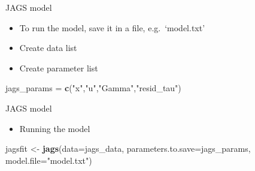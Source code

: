 \documentclass[
  ignorenonframetext,
]{beamer}
\newenvironment{Shaded}{\begin{snugshade}}{\end{snugshade}}
\newcommand{\DataTypeTok}[1]{\textcolor[rgb]{0.13,0.29,0.53}{#1}}
\newcommand{\KeywordTok}[1]{\textcolor[rgb]{0.13,0.29,0.53}{\textbf{#1}}}
\newcommand{\NormalTok}[1]{#1}
\newcommand{\OperatorTok}[1]{\textcolor[rgb]{0.81,0.36,0.00}{\textbf{#1}}}
\newcommand{\StringTok}[1]{\textcolor[rgb]{0.31,0.60,0.02}{#1}}
\providecommand{\tightlist}{%
  \setlength{\itemsep}{0pt}\setlength{\parskip}{0pt}}
\begin{document}
\begin{frame}[fragile]{JAGS model}
\protect\hypertarget{jags-model-5}{}

\begin{itemize}
\item
  To run the model, save it in a file, e.g.~`model.txt'
\item
  Create data list
\end{itemize}

\begin{Shaded}
\end{Shaded}

\begin{itemize}
\tightlist
\item
  Create parameter list
\end{itemize}

\begin{Shaded}
\begin{Highlighting}[]
\NormalTok{jags_params =}\StringTok{ }\KeywordTok{c}\NormalTok{(}\StringTok{"x"}\NormalTok{,}\StringTok{"u"}\NormalTok{,}\StringTok{"Gamma"}\NormalTok{,}\StringTok{"resid_tau"}\NormalTok{)}
\end{Highlighting}
\end{Shaded}

\end{frame}

\begin{frame}[fragile]{JAGS model}
\protect\hypertarget{jags-model-6}{}

\begin{itemize}
\tightlist
\item
  Running the model
\end{itemize}

\begin{Shaded}
\begin{Highlighting}[]
\NormalTok{jagsfit <-}\StringTok{ }\KeywordTok{jags}\NormalTok{(}\DataTypeTok{data=}\NormalTok{jags_data, }
\DataTypeTok{parameters.to.save=}\NormalTok{jags_params,}
\DataTypeTok{model.file=}\StringTok{"model.txt"}\NormalTok{)}
\end{Highlighting}
\end{Shaded}

\end{frame}
\end{document}
